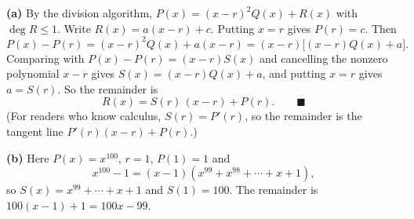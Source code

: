 \textbf{(a)} By the division algorithm, $P(x)=(x-r)^2Q(x)+R(x)$ with $\deg R\le1$. Write $R(x)=a(x-r)+c$. Putting $x=r$ gives $P(r)=c$. Then
\[P(x)-P(r)=(x-r)^2Q(x)+a(x-r)=(x-r)\bigl[(x-r)Q(x)+a\bigr].\]
Comparing with $P(x)-P(r)=(x-r)S(x)$ and cancelling the nonzero polynomial $x-r$ gives $S(x)=(x-r)Q(x)+a$, and putting $x=r$ gives $a=S(r)$. So the remainder is
\[R(x)=S(r)\,(x-r)+P(r).\qquad\blacksquare\]
(For readers who know calculus, $S(r)=P'(r)$, so the remainder is the tangent line $P'(r)(x-r)+P(r)$.)

\textbf{(b)} Here $P(x)=x^{100}$, $r=1$, $P(1)=1$ and
\[x^{100}-1=(x-1)\left(x^{99}+x^{98}+\cdots+x+1\right),\]
so $S(x)=x^{99}+\cdots+x+1$ and $S(1)=100$. The remainder is $100(x-1)+1=\boxed{100x-99}$.

